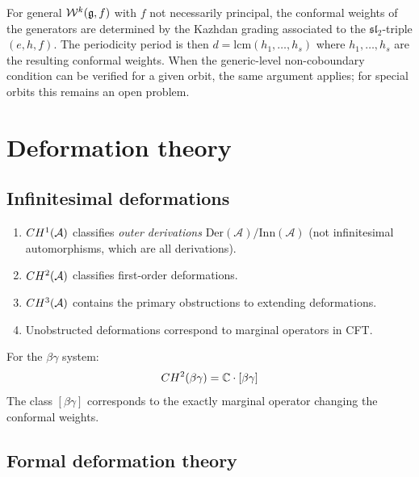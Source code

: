 \begin{remark}
For general $\mathcal{W}^k(\mathfrak{g}, f)$ with $f$ not necessarily principal, the conformal weights of the generators are determined by the Kazhdan grading associated to the $\mathfrak{sl}_2$-triple $(e, h, f)$.  The periodicity period is then $d = \mathrm{lcm}(h_1, \ldots, h_s)$ where $h_1, \ldots, h_s$ are the resulting conformal weights.  When the generic-level non-coboundary condition can be verified for a given orbit, the same argument applies; for special orbits this remains an open problem.
\end{remark}

\section{Deformation theory}

\subsection{Infinitesimal deformations}

\begin{theorem}\label{thm:deformation-classification}
\begin{enumerate}
\item $CH^1(\mathcal{A})$ classifies \emph{outer derivations} $\mathrm{Der}(\mathcal{A})/\mathrm{Inn}(\mathcal{A})$ (not infinitesimal automorphisms, which are all derivations).
\item $CH^2(\mathcal{A})$ classifies first-order deformations.
\item $CH^3(\mathcal{A})$ contains the primary obstructions to extending deformations.
\item Unobstructed deformations correspond to marginal operators in CFT.
\end{enumerate}
\end{theorem}

\begin{example}
For the $\beta\gamma$ system:
\[CH^2(\beta\gamma) = \mathbb{C} \cdot [\beta\gamma]\]
The class $[\beta\gamma]$ corresponds to the exactly marginal operator changing the conformal weights.
\end{example}

\subsection{Formal deformation theory}


